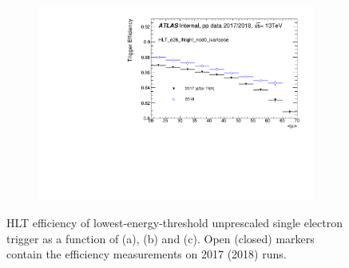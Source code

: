 \begin{figure}[h!tb]
\begin{subfigure}[c]{.48\textwidth}
\caption{}
\end{subfigure} \\
\begin{subfigure}[c]{.48\textwidth}
\centering
\includegraphics[width=\textwidth]{sections/operation/figures/efficiencies/eff_EGAM1_e26_lhtight_nod0_ivarloose_2017_after_ts1_and_2018_mu.pdf}
\caption{}
\end{subfigure}
\caption{\label{fig:primary_triggers_comp_2018}HLT efficiency of
lowest-energy-threshold unprescaled single electron trigger as a function of
\et (a), \eta (b) and \avgmu (c). Open (closed) markers contain the efficiency
measurements on 2017 (2018) runs.}
\end{figure}

